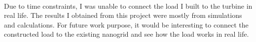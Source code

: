 \documentclass[titlepage]{article}
\begin{document}
\paragraph{} Due to time constraints, I was unable to connect the load I built to the turbine in real life. The results I obtained from this project were mostly from simulations and calculations. For future work purpose, it would be interesting to connect the constructed load to the existing nanogrid and see how the load works in real life. 
 
\clearpage
{}
\printbibliography
\end{document}

